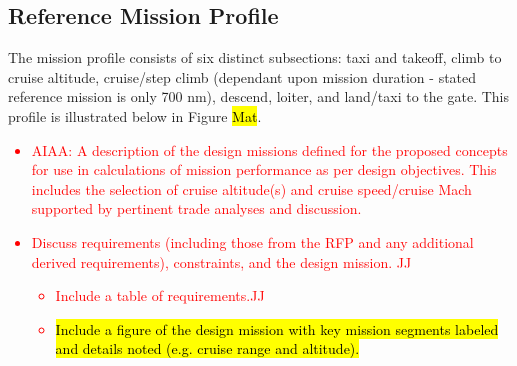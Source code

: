 \subsection{Reference Mission Profile}
The mission profile consists of six distinct subsections: taxi and takeoff, climb to cruise altitude, cruise/step climb (dependant upon mission duration - stated reference mission is only 700 nm), descend, loiter, and land/taxi to the gate.  This profile is illustrated below in Figure \hl{Mat}. 





\textcolor{red}{
\begin{itemize}
    \item AIAA: A description of the design missions defined for the proposed concepts for use in
calculations of mission performance as per design objectives. This includes the
selection of cruise altitude(s) and cruise speed/cruise Mach supported by pertinent
trade analyses and discussion.
    \item Discuss requirements (including those from the RFP and any additional derived requirements), constraints, and the design mission. \checkmark JJ
    \begin{itemize}
        \item Include a table of requirements.\checkmark JJ
        \item \hl{Include a figure of the design mission with key mission segments labeled and details noted (e.g. cruise range and altitude).}
    \end{itemize}
\end{itemize}}